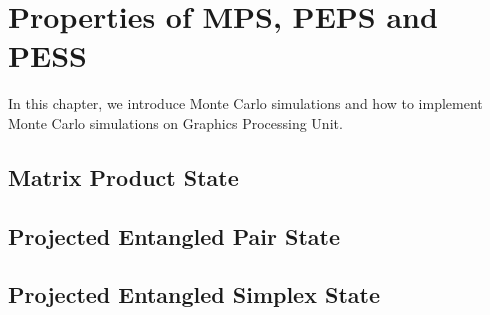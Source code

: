 \chapter{Properties of MPS, PEPS and PESS}
\label{chapter:properties}
In this chapter, we introduce Monte Carlo simulations and how to implement Monte Carlo simulations on Graphics Processing Unit.
\section{Matrix Product State}
\section{Projected Entangled Pair State}
\section{Projected Entangled Simplex State}
